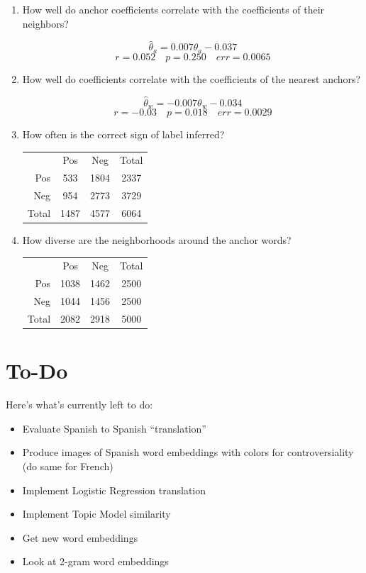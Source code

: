 \documentclass[11pt]{article} %
\begin{document}
\begin{enumerate}
\item How well do anchor coefficients correlate with the coefficients of their neighbors?

\[ \hat{\theta}_a = 0.007 \theta_a - 0.037 \]
\[ r = 0.052 \quad p = 0.250 \quad err = 0.0065 \]


\item How well do coefficients correlate with the coefficients of the nearest anchors?

\[ \hat{\theta}_w = -0.007 \theta_w - 0.034 \]
\[ r = -0.03 \quad p = 0.018 \quad err = 0.0029 \]


\item How often is the correct sign of label inferred?

\begin{center}
\begin{tabular}{r|c|c|c}
& Pos & Neg & Total \\
Pos & 533 & 1804 & 2337 \\
Neg & 954 & 2773 & 3729 \\
Total & 1487 & 4577 & 6064 
\end{tabular}
\end{center}

\item How diverse are the neighborhoods around the anchor words?
\begin{center}
\begin{tabular}{r|c|c|c}
& Pos & Neg & Total \\
Pos & 1038 & 1462 & 2500 \\
Neg & 1044 & 1456 & 2500 \\
Total & 2082 & 2918 & 5000 
\end{tabular}
\end{center}



\end{enumerate}


\section{To-Do}
Here's what's currently left to do:
\begin{itemize}
\item Evaluate Spanish to Spanish ``translation''
\item Produce images of Spanish word embeddings with colors for controversiality (do same for French)
\item Implement Logistic Regression translation
\item Implement Topic Model similarity
\item Get new word embeddings
\item Look at 2-gram word embeddings
\end{itemize}
\end{document}
